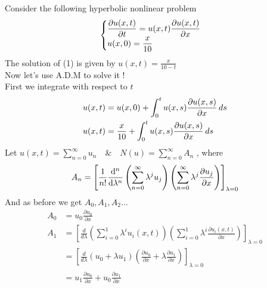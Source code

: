 \documentclass[]{article}
\begin{document}



\setcounter{equation}{0}
\begin{example}
    Consider the following hyperbolic nonlinear problem\\
    \begin{equation}
        \begin{cases}
            \displaystyle \pdv{u(x,t)}{t} =  u(x,t)\pdv{u(x,t)}{ x}
            \\
            \displaystyle u(x,0) = \frac{x}{10}
        \end{cases}
    \end{equation}
    The solution of (1) is given by $\displaystyle u(x,t)=\frac{x}{10-t}$\\
    Now let's use A.D.M to solve it !\\
    First we integrate with respect to $t$
    \begin{align*}
        u(x,t) & = u(x,0) + \int_{0}^{t} u(x,s) \pdv{u(x,s)}{x} \, ds
        \\
        u(x,t) & = \frac{x}{10} + \int_{0}^{t} u(x,s) \pdv{u(x,s)}{x} \, ds
    \end{align*}
    Let $\displaystyle u(x,t) = \sum_{n=0}^{\infty} u_n \quad \& \quad N(u) = \sum_{n=0}^{\infty} A_n$ , where
    \begin{equation*}
        A_n = \left[ \frac{1}{n!} \dv[n]{}{\lambda}  \left( \sum_{n=0}^{\infty} \lambda^j u_j \right) \left( \sum_{n=0}^{\infty}\lambda^j \pdv{u_j}{x} \right) \right]_{\lambda = 0}
    \end{equation*}
    And as before we get $A_0,A_1,A_2\dots$
    \begin{align*}
        A_0 & = u_0\frac{\partial u_0}{\partial x}
        \\
        A_1 & = \left[\frac{d}{d \lambda} \left(\sum_{i=0}^{1}  \lambda^i u_i(x,t)\right)\left(\sum_{i=0}^{1}  \lambda^i \frac{\partial u_i(x,t)}{\partial x}\right)\right]_{\lambda = 0}
        \\
            & = \left[\frac{d}{d \lambda} \left(u_0 + \lambda u_1 \right)\left(\frac{\partial u_0}{\partial x} + \lambda\frac{\partial u_1}{\partial x}\right)\right]_{\lambda = 0}
        \\
            & = u_1 \frac{\partial u_0}{\partial x} + u_0 \frac{\partial u_1}{\partial x}

\end{align*}
\end{example}
\end{document}
